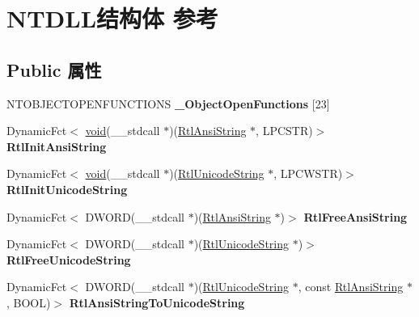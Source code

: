 \hypertarget{struct_n_t_d_l_l}{}\section{N\+T\+D\+L\+L结构体 参考}
\label{struct_n_t_d_l_l}
\subsection*{Public 属性}
\begin{DoxyCompactItemize}
\item 
\mbox{\label{struct_n_t_d_l_l_aea4a0282b1641a8eb0eaee58b1887128}} 
N\+T\+O\+B\+J\+E\+C\+T\+O\+P\+E\+N\+F\+U\+N\+C\+T\+I\+O\+NS {\bfseries \+\_\+\+Object\+Open\+Functions} \mbox{[}23\mbox{]}
\item 
\mbox{\label{struct_n_t_d_l_l_ab323e4579a4eb3f424e572745235c7b1}} 
Dynamic\+Fct$<$ \hyperlink{interfacevoid}{void}(\+\_\+\+\_\+stdcall $\ast$)(\hyperlink{struct_rtl_ansi_string}{Rtl\+Ansi\+String} $\ast$, L\+P\+C\+S\+TR)$>$ {\bfseries Rtl\+Init\+Ansi\+String}
\item 
\mbox{\label{struct_n_t_d_l_l_a8a0a76624cec19688519182ce56c20f2}} 
Dynamic\+Fct$<$ \hyperlink{interfacevoid}{void}(\+\_\+\+\_\+stdcall $\ast$)(\hyperlink{struct_rtl_unicode_string}{Rtl\+Unicode\+String} $\ast$, L\+P\+C\+W\+S\+TR)$>$ {\bfseries Rtl\+Init\+Unicode\+String}
\item 
\mbox{\label{struct_n_t_d_l_l_af3a3fcc40a2ca534acb6c8c9dfb8f666}} 
Dynamic\+Fct$<$ D\+W\+O\+RD(\+\_\+\+\_\+stdcall $\ast$)(\hyperlink{struct_rtl_ansi_string}{Rtl\+Ansi\+String} $\ast$)$>$ {\bfseries Rtl\+Free\+Ansi\+String}
\item 
\mbox{\label{struct_n_t_d_l_l_a4c322c09067eb90622ad02ac59968cbd}} 
Dynamic\+Fct$<$ D\+W\+O\+RD(\+\_\+\+\_\+stdcall $\ast$)(\hyperlink{struct_rtl_unicode_string}{Rtl\+Unicode\+String} $\ast$)$>$ {\bfseries Rtl\+Free\+Unicode\+String}
\item 
\mbox{\label{struct_n_t_d_l_l_abe173b65c61221531a9661619cf9f8a4}} 
Dynamic\+Fct$<$ D\+W\+O\+RD(\+\_\+\+\_\+stdcall $\ast$)(\hyperlink{struct_rtl_unicode_string}{Rtl\+Unicode\+String} $\ast$, const \hyperlink{struct_rtl_ansi_string}{Rtl\+Ansi\+String} $\ast$, B\+O\+OL)$>$ {\bfseries Rtl\+Ansi\+String\+To\+Unicode\+String}

\end{DoxyCompactItemize}
